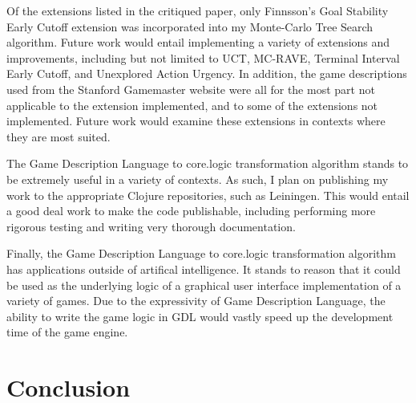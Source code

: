 \documentclass[letterpaper]{article}
\begin{document}
Of the extensions listed in the critiqued paper, only Finnsson's Goal Stability Early Cutoff extension was incorporated into my Monte-Carlo Tree Search algorithm. Future work would entail implementing a variety of extensions and improvements, including but not limited to UCT, MC-RAVE, Terminal Interval Early Cutoff, and Unexplored Action Urgency. In addition, the game descriptions used from the Stanford Gamemaster website were all for the most part not applicable to the extension implemented, and to some of the extensions not implemented. Future work would examine these extensions in contexts where they are most suited.

The Game Description Language to core.logic transformation algorithm stands to be extremely useful in a variety of contexts. As such, I plan on publishing my work to the appropriate Clojure repositories, such as Leiningen. This would entail a good deal work to make the code publishable, including performing more rigorous testing and writing very thorough documentation.

Finally, the Game Description Language to core.logic transformation algorithm has applications outside of artifical intelligence. It stands to reason that it could be used as the underlying logic of a graphical user interface implementation of a variety of games. Due to the expressivity of Game Description Language, the ability to write the game logic in GDL would vastly speed up the development time of the game engine.

\section{Conclusion}



\end{document}

